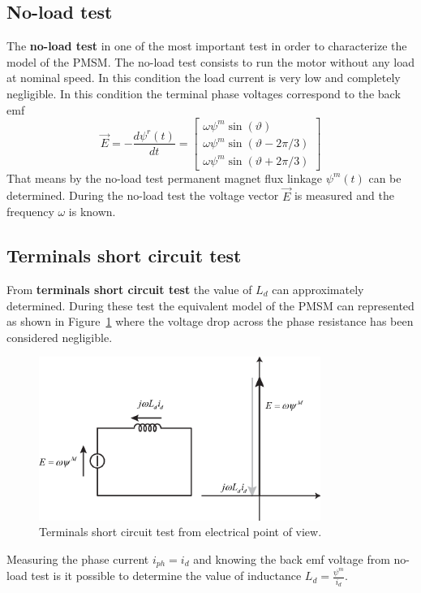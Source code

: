\documentclass[11pt,a4paper]{article}
\numberwithin{equation}{section}
\theoremstyle{it}
\theoremstyle{definition}
\begin{document}
\begin{onehalfspace}
\subsection{No-load test}
The \textbf{no-load test} in one of the most important test in order to characterize the model of the PMSM. The no-load test consists to run the motor without any load at nominal speed. In this condition the load current is very low and completely negligible. In this condition the terminal phase voltages correspond to the back emf 
\begin{equation}
	\vec{E}=-\frac{d\psi^r(t)}{dt}=\begin{bmatrix} \omega\psi^m\sin(\vartheta) \\[6pt] \omega\psi^m\sin(\vartheta-2\pi/3) \\[6pt] \omega\psi^m\sin(\vartheta +2\pi/3)\end{bmatrix}
\end{equation}
That means by the no-load test permanent magnet flux linkage $\psi^m(t)$ can be determined. During the no-load test the voltage vector $\vec{E}$ is measured and the frequency $\omega$ is known.

\subsection{Terminals short circuit test}
From \textbf{terminals short circuit test} the value of $L_d$ can approximately determined. During these test the equivalent model of the PMSM can represented as shown in Figure~\ref{TerminalsShortCircuitTest} where the voltage drop across the phase resistance has been considered negligible.
\begin{figure}[H]
	\centering
	\includegraphics[width = 260pt, keepaspectratio]{figures/pmsm/TerminalsShortCircuitTest.eps}
	\captionsetup{width=0.5\textwidth, font=small}
	\caption{Terminals short circuit test from electrical point of view.}
	\label{TerminalsShortCircuitTest}
\end{figure}
Measuring the phase current $i_{ph}=i_d$ and knowing the back emf voltage from no-load test is it possible to determine the value of inductance $L_d = \frac{\psi^m}{i_d}$. 


\end{onehalfspace}
\end{document}
